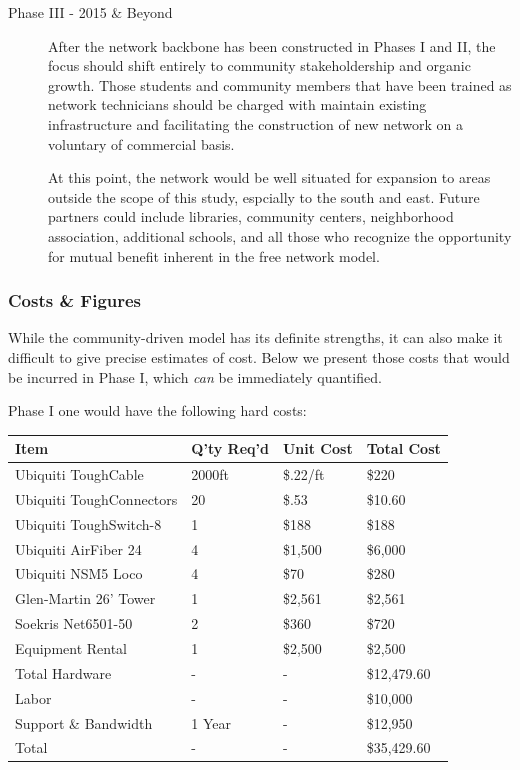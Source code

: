 \begin{description}
\item[Phase III - 2015 \& Beyond] After the network backbone has been constructed in Phases I and II, the focus should shift entirely to community stakeholdership and organic growth. Those students and community members that have been trained as network technicians should be charged with maintain existing infrastructure and facilitating the construction of new network on a voluntary of commercial basis. \par
At this point, the network would be well situated for expansion to areas outside the scope of this study, espcially to the south and east. Future partners could include libraries, community centers, neighborhood association, additional schools, and all those who recognize the opportunity for mutual benefit inherent in the free network model. \par
\end{description}

\subsubsection{Costs \& Figures}
While the community-driven model has its definite strengths, it can also make it difficult to give precise estimates of cost. Below we present those costs that would be incurred in Phase I, which \emph{can} be immediately quantified.

Phase I one would have the following hard costs:
\begin{center}
\begin{tabular}{|p{5cm}|l|l|l|}
\hline
Item & Q'ty Req'd & Unit Cost & Total Cost \\ \hline
Ubiquiti ToughCable & 2000ft & \$.22/ft & \$220 \\ \hline
Ubiquiti ToughConnectors & 20 & \$.53 & \$10.60 \\ \hline
Ubiquiti ToughSwitch-8 & 1 & \$188 & \$188 \\ \hline
Ubiquiti AirFiber 24 & 4 & \$1,500 & \$6,000 \\ \hline
Ubiquiti NSM5 Loco & 4 & \$70 & \$280 \\ \hline
Glen-Martin 26' Tower & 1 & \$2,561 & \$2,561 \\ \hline
Soekris Net6501-50 & 2 & \$360 & \$720 \\ \hline 
Equipment Rental & 1 & \$2,500 & \$2,500 \\ \hline
Total Hardware & - & - & \$12,479.60 \\ \hline
Labor & - & - & \$10,000 \\ \hline
Support \& Bandwidth & 1 Year & - & \$12,950 \\ \hline
Total & - & - & \$35,429.60 \\ \hline
\end{tabular}
\end{center} 


